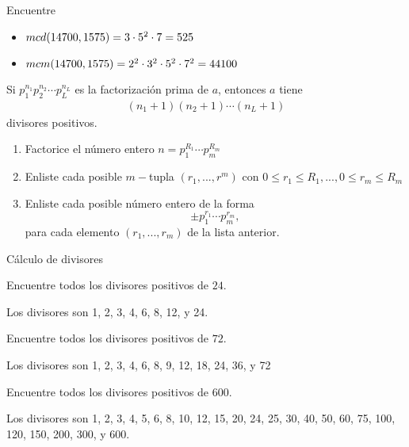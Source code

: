 {}
Encuentre
\begin{itemize}
	\item $mcd(14700,1575) = 3 \cdot 5^{2} \cdot 7=525$ 
	\item $mcm(14700,1575) = 2^{2} \cdot 3^{2} \cdot 5^{2} \cdot 7^{2}= 44100$
\end{itemize}


{}
	\begin{prop}
		Si $p_{1}^{n_{1}}p_{2}^{n_{2}}\cdots p_{L}^{n_{L}}$ es la factorización prima de $a$, entonces $a$ tiene \begin{align*}
			\left( n_{1}+1 \right)\left( n_{2}+1 \right)\cdots\left( n_{L}+1 \right)
		\end{align*} divisores positivos.
		
	\end{prop}
	



	\begin{alg}
		\begin{enumerate}
			\item Factorice el número entero
			$n=p_{1}^{R_{1}}\cdots p_{m}^{R_{m}}$
			\item Enliste cada posible $m-$tupla
			$\left( r_{1},...,r^{m} \right)$
			con $0\leq r_{1}\leq R_{1},...,0\leq r_{m}\leq R_{m}$
			\item Enliste cada posible número entero de la forma $$\pm p_{1}^{r_{1}}\cdots p_{m}^{r_{m}},$$ para cada elemento $\left( r_{1},...,r_{m} \right)$ de la lista anterior.
		\end{enumerate}
	\end{alg}
	



{Cálculo de divisores}
	\begin{problema}
		Encuentre todos los divisores positivos de $24$.
	\end{problema}
	
	Los divisores son 1, 2, 3, 4, 6, 8, 12, y 24.
	

{}
	\begin{problema}
		Encuentre todos los divisores positivos de $72$.
	\end{problema}
	
	Los divisores son 1, 2, 3, 4, 6, 8, 9, 12, 18, 24, 36, y 72
	

{}
	\begin{problema}
		Encuentre todos los divisores positivos de $600$.
	\end{problema}
	
	Los divisores son 1, 2, 3, 4, 5, 6, 8, 10, 12, 15, 20, 24, 25, 30, 40, 50, 60, 75, 100, 120, 150, 200, 300, y 600.


